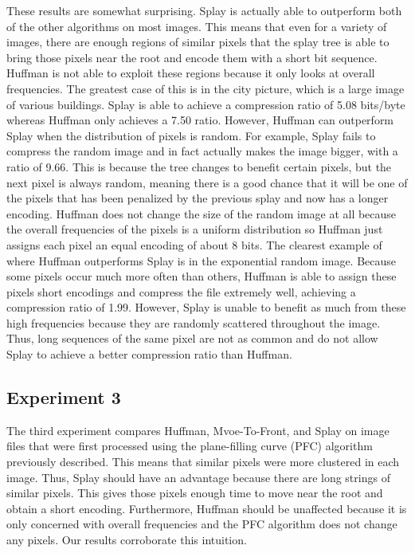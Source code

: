 \documentclass[twoside]{article}
\begin{document}
\begin{multicols}{2}
These results are somewhat surprising. Splay is actually able to outperform both of the other algorithms on most images. This means that even for a variety of images, there are enough regions of similar pixels that the splay tree is able to bring those pixels near the root and encode them with a short bit sequence. Huffman is not able to exploit these regions because it only looks at overall frequencies. The greatest case of this is in the city picture, which is a large image of various buildings. Splay is able to achieve a compression ratio of 5.08 bits/byte whereas Huffman only achieves a 7.50 ratio. However, Huffman can outperform Splay when the distribution of pixels is random. For example, Splay fails to compress the random image and in fact actually makes the image bigger, with a ratio of 9.66. This is because the tree changes to benefit certain pixels, but the next pixel is always random, meaning there is a good chance that it will be one of the pixels that has been penalized by the previous splay and now has a longer encoding. Huffman does not change the size of the random image at all because the overall frequencies of the pixels is a uniform distribution so Huffman just assigns each pixel an equal encoding of about 8 bits. The clearest example of where Huffman outperforms Splay is in the exponential random image. Because some pixels occur much more often than others, Huffman is able to assign these pixels short encodings and compress the file extremely well, achieving a compression ratio of 1.99. However, Splay is unable to benefit as much from these high frequencies because they are randomly scattered throughout the image. Thus, long sequences of the same pixel are not as common and do not allow Splay to achieve a better compression ratio than Huffman.

\subsection*{Experiment 3}
The third experiment compares Huffman, Mvoe-To-Front, and Splay on image files that were first processed using the plane-filling curve (PFC) algorithm previously described. This means that similar pixels were more clustered in each image. Thus, Splay should have an advantage because there are long strings of similar pixels. This gives those pixels enough time to move near the root and obtain a short encoding. Furthermore, Huffman should be unaffected because it is only concerned with overall frequencies and the PFC algorithm does not change any pixels. Our results corroborate this intuition. 


\end{multicols}
\end{document}

